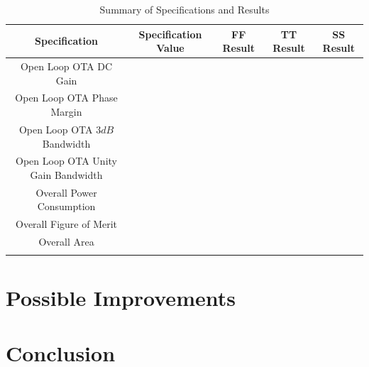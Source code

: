 \documentclass[journal]{IEEEtran}
\begin{document}
\begin{table}
\centering
\caption{Summary of Specifications and Results}
\label{tab:specs_results}
\begin{tabular}{|c|c|c|c|c|}
\hline Specification & Specification Value & FF Result & TT Result & SS Result\\ 
\hline Open Loop OTA DC Gain &  & &  & \\ 
\hline Open Loop OTA Phase Margin &  & &  & \\ 
\hline Open Loop OTA $3dB$ Bandwidth &  & &  & \\ 
\hline Open Loop OTA Unity Gain Bandwidth &  & &  & \\ 
\hline Overall Power Consumption &  & &  & \\ 
\hline Overall Figure of Merit &  & &  & \\ 
\hline Overall Area &  & &  & \\ 
\hline  &  & &  & \\ 
\hline 
\end{tabular} 
\end{table}


\section{Possible Improvements}

\section{Conclusion}



%
%
%

%
%
\end{document}
